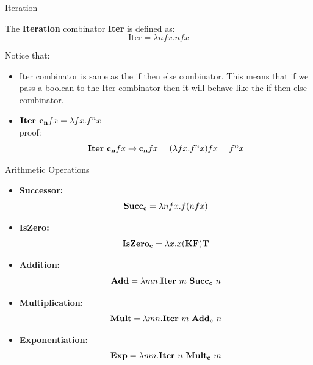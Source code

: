 \documentclass{beamer}
\begin{document}
\begin{frame}{Iteration}

  \begin{definition}
    The \textbf{Iteration} combinator \textbf{Iter} is defined as:
    \[
      \text{Iter} = \lambda n f x. n f x
    \]
  \end{definition}
  Notice that:
  \begin{itemize}
    \item Iter combinator is same as the if then else combinator. This means that if we pass a boolean to the Iter combinator then it will behave like the if then else combinator.
    \item \(\text{\textbf{Iter }} \mathbf{c_n} f x = \lambda fx. f^n x\) \\
    proof:
    \[
      \text{\textbf{Iter} } \mathbf{c_n} f x \rightarrow \mathbf{c_n} f x = (\lambda fx.f^n x)fx = f^n x
    \]

  \end{itemize}
\end{frame}

\begin{frame}{Arithmetic Operations}
  \begin{itemize}
    \item \textbf{Successor:}  
      \[
      \text{\textbf{Succ}}_\mathbf{c} = \lambda nfx. f(nfx)
      \]
      
    \item \textbf{IsZero:}  
      \[
      \text{\textbf{IsZero}}_\mathbf{c} = \lambda x. x (\mathbf{K} \mathbf{F}) \mathbf{T}
      \]
      
    \item \textbf{Addition:}  
      \[
      \text{\textbf{Add}} = \lambda mn. \text{\textbf{Iter} } m \text{ \textbf{Succ}}_\mathbf{c} \ n
      \]
      
    \item \textbf{Multiplication:}  
      \[
      \text{\textbf{Mult}} = \lambda mn. \text{\textbf{Iter} } m \text{ \textbf{Add}}_\mathbf{c} \ n
      \]
      
    \item \textbf{Exponentiation:}  
      \[
      \text{\textbf{Exp}} = \lambda mn. \text{\textbf{Iter} } n \text{ \textbf{Mult}}_\mathbf{c} \ m
      \]
  \end{itemize}
\end{frame}
\end{document}
